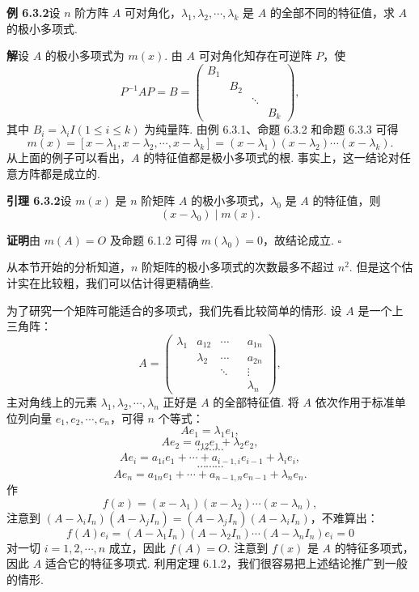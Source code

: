\documentclass[UTF8, 12pt, fontset=fandol, oneside]{ctexart}
\begin{document}
\noindent\textbf{例 6.3.2}\quad 设 $n$ 阶方阵 $A$ 可对角化，$\lambda_1,\lambda_2,\cdots,\lambda_k$ 是 $A$ 的全部不同的特征值，求 $A$ 的极小多项式.

\noindent\textbf{解}\quad 设 $A$ 的极小多项式为 $m(x)$. 由 $A$ 可对角化知存在可逆阵 $P$，使
\[
P^{-1}AP=B=
\left(\begin{array}{cccc}
B_1 & & & \\
& B_2 & & \\
& & \ddots & \\
& & & B_k
\end{array}\right),
\]
其中 $B_i=\lambda_iI(1\leq i\leq k)$ 为纯量阵. 由例 6.3.1、命题 6.3.2 和命题 6.3.3 可得
\[
m(x)=[x-\lambda_1,x-\lambda_2,\cdots,x-\lambda_k]=(x-\lambda_1)(x-\lambda_2)\cdots(x-\lambda_k).
\]
从上面的例子可以看出，$A$ 的特征值都是极小多项式的根. 事实上，这一结论对任意方阵都是成立的.

\noindent\textbf{引理 6.3.2}\quad 设 $m(x)$ 是 $n$ 阶矩阵 $A$ 的极小多项式，$\lambda_0$ 是 $A$ 的特征值，则
\[
(x-\lambda_0)\mid m(x).
\]

\noindent\textbf{证明}\quad 由 $m(A)=O$ 及命题 6.1.2 可得 $m(\lambda_0)=0$，故结论成立. $\square$

从本节开始的分析知道，$n$ 阶矩阵的极小多项式的次数最多不超过 $n^2$. 但是这个估计实在比较粗，我们可以估计得更精确些.

为了研究一个矩阵可能适合的多项式，我们先看比较简单的情形. 设 $A$ 是一个上三角阵：
\[
A=\left(\begin{array}{ccccc}
\lambda_1 & a_{12} & \cdots & & a_{1n}\\
& \lambda_2 & \cdots & & a_{2n}\\
& & \ddots & & \vdots\\
& & & & \lambda_n
\end{array}\right),
\]
主对角线上的元素 $\lambda_1,\lambda_2,\cdots,\lambda_n$ 正好是 $A$ 的全部特征值. 将 $A$ 依次作用于标准单位列向量 $e_1,e_2,\cdots,e_n$，可得 $n$ 个等式：
\[
Ae_1=\lambda_1e_1,
\]
\[
Ae_2=a_{12}e_1+\lambda_2e_2,
\]
\[
\cdots\cdots\cdots
\]
\[
Ae_i=a_{1i}e_1+\cdots+a_{i-1,i}e_{i-1}+\lambda_ie_i,
\]
\[
\cdots\cdots\cdots
\]
\[
Ae_n=a_{1n}e_1+\cdots+a_{n-1,n}e_{n-1}+\lambda_ne_n.
\]
作
\[
f(x)=(x-\lambda_1)(x-\lambda_2)\cdots(x-\lambda_n),
\]
注意到 $(A-\lambda_iI_n)(A-\lambda_jI_n)=(A-\lambda_jI_n)(A-\lambda_iI_n)$，不难算出：
\[
f(A)e_i=(A-\lambda_1I_n)(A-\lambda_2I_n)\cdots(A-\lambda_nI_n)e_i=0
\]
对一切 $i=1,2,\cdots,n$ 成立，因此 $f(A)=O$. 注意到 $f(x)$ 是 $A$ 的特征多项式，因此 $A$ 适合它的特征多项式. 利用定理 6.1.2，我们很容易把上述结论推广到一般的情形.
\end{document}

